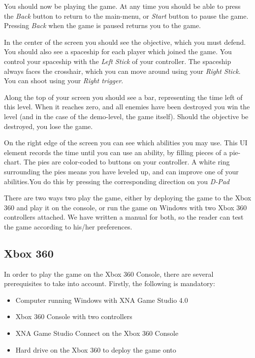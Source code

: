 You should now be playing the game. At any time you should be able to press
the \emph{Back} button to return to the main-menu, or \emph{Start} button to
pause the game. Pressing \emph{Back} when the game is paused returns you to
the game.

In the center of the screen you should see the objective, which you must 
defend. You should also see a spaceship for each player which joined the game.
You control your spaceship with the \emph{Left Stick} of your controller.
The spaceship always faces the crosshair, which you can move around using
your \emph{Right Stick}. You can shoot using your \emph{Right trigger}.

Along the top of your screen you should see a bar, representing the time
left of this level. When it reaches zero, and all enemies have been destroyed
you win the level (and in the case of the demo-level, the game itself).
Should the objective be destroyed, you lose the game.

On the right edge of the screen you can see which abilities you may use.
This UI element records the time until you can use an ability, by filling
pieces of a pie-chart. The pies are color-coded to buttons on your controller.
A white ring surrounding the pies means you have leveled up, and can improve
one of your abilities.You do this by pressing the corresponding direction
on you \emph{D-Pad}

There are two ways two play the game, either by deploying the game to the Xbox 360 and play it on the console, or 
run the game on Windows with two Xbox 360 controllers attached. We have written a manual for both, so the reader can 
test the game according to his/her preferences. 

\subsection{Xbox 360}

In order to play the game on the Xbox 360 Console, there are several prerequisites to take into account. Firstly, 
the following is mandatory\cite{deploy}:

\begin{itemize}
	\item Computer running Windows with XNA Game Studio 4.0 
	\item Xbox 360 Console with two controllers
	\item XNA Game Studio Connect on the Xbox 360 Console 
	\item Hard drive on the Xbox 360 to deploy the game onto 
\end{itemize}

